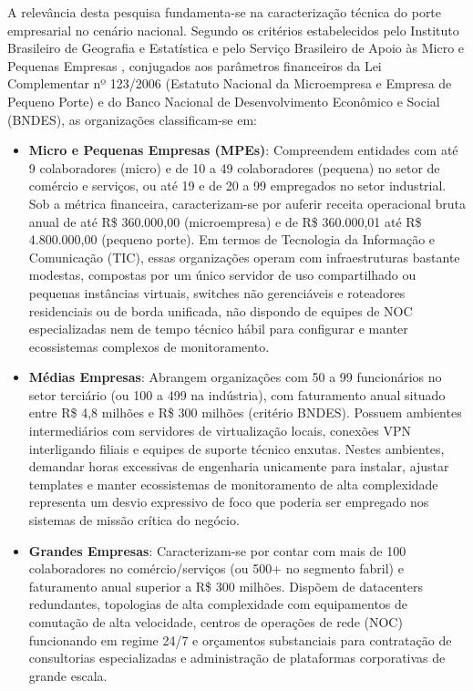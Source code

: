 \documentclass[12pt,a4paper]{article}
\begin{document}
A relevância desta pesquisa fundamenta-se na caracterização técnica do porte empresarial no cenário nacional. Segundo os critérios estabelecidos pelo Instituto Brasileiro de Geografia e Estatística \cite{ibge2023classificacao} e pelo Serviço Brasileiro de Apoio às Micro e Pequenas Empresas \cite{sebrae2023anuario}, conjugados aos parâmetros financeiros da Lei Complementar nº 123/2006 \cite{brasil2006lei123} (Estatuto Nacional da Microempresa e Empresa de Pequeno Porte) e do Banco Nacional de Desenvolvimento Econômico e Social (BNDES), as organizações classificam-se em:

\begin{itemize}[leftmargin=1.25cm]
\item \textbf{Micro e Pequenas Empresas (MPEs)}: Compreendem entidades com até 9 colaboradores (micro) e de 10 a 49 colaboradores (pequena) no setor de comércio e serviços, ou até 19 e de 20 a 99 empregados no setor industrial. Sob a métrica financeira, caracterizam-se por auferir receita operacional bruta anual de até R\$ 360.000,00 (microempresa) e de R\$ 360.000,01 até R\$ 4.800.000,00 (pequeno porte). Em termos de Tecnologia da Informação e Comunicação (TIC), essas organizações operam com infraestruturas bastante modestas, compostas por um único servidor de uso compartilhado ou pequenas instâncias virtuais, switches não gerenciáveis e roteadores residenciais ou de borda unificada, não dispondo de equipes de NOC especializadas nem de tempo técnico hábil para configurar e manter ecossistemas complexos de monitoramento.
\item \textbf{Médias Empresas}: Abrangem organizações com 50 a 99 funcionários no setor terciário (ou 100 a 499 na indústria), com faturamento anual situado entre R\$ 4,8 milhões e R\$ 300 milhões (critério BNDES). Possuem ambientes intermediários com servidores de virtualização locais, conexões VPN interligando filiais e equipes de suporte técnico enxutas. Nestes ambientes, demandar horas excessivas de engenharia unicamente para instalar, ajustar templates e manter ecossistemas de monitoramento de alta complexidade representa um desvio expressivo de foco que poderia ser empregado nos sistemas de missão crítica do negócio.
\item \textbf{Grandes Empresas}: Caracterizam-se por contar com mais de 100 colaboradores no comércio/serviços (ou 500+ no segmento fabril) e faturamento anual superior a R\$ 300 milhões. Dispõem de datacenters redundantes, topologias de alta complexidade com equipamentos de comutação de alta velocidade, centros de operações de rede (NOC) funcionando em regime 24/7 e orçamentos substanciais para contratação de consultorias especializadas e administração de plataformas corporativas de grande escala.
\end{itemize}
\end{document}
